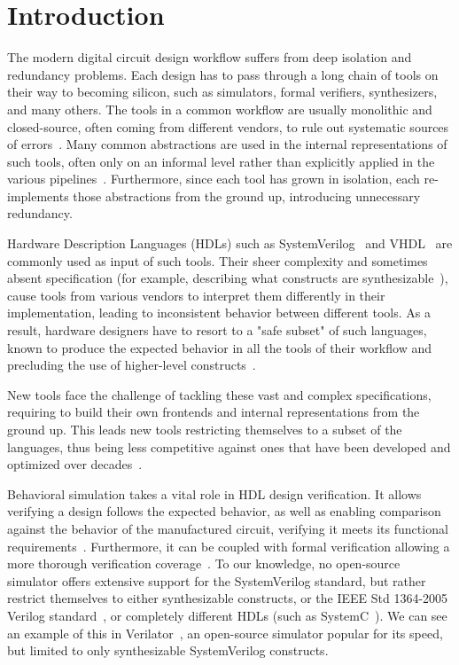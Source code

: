 \chapter{Introduction}
\label{ch:intro}
The modern digital circuit design workflow suffers from deep isolation and redundancy problems. Each design has to pass through a long chain of tools on their way to becoming silicon, such as simulators, formal verifiers, synthesizers, and many others. The tools in a common workflow are usually monolithic and closed-source, often coming from different vendors, to rule out systematic sources of errors~\cite{Schuiki2020}. Many common abstractions are used in the internal representations of such tools, often only on an informal level rather than explicitly applied in the various pipelines~\cite{Neuendorffer}. Furthermore, since each tool has grown in isolation, each re-implements those abstractions from the ground up, introducing unnecessary redundancy.

Hardware Description Languages (HDLs) such as SystemVerilog~\cite{SV2018} and VHDL~\cite{VHDL2009} are commonly used as input of such tools. Their sheer complexity and sometimes absent specification (for example, describing what constructs are synthesizable~\cite{Sutherland2006APF}), cause tools from various vendors to interpret them differently in their implementation, leading to inconsistent behavior between different tools. As a result, hardware designers have to resort to a "safe subset" of such languages, known to produce the expected behavior in all the tools of their workflow and precluding the use of higher-level constructs~\cite{Schuiki2020}.

New tools face the challenge of tackling these vast and complex specifications, requiring to build their own frontends and internal representations from the ground up. This leads new tools restricting themselves to a subset of the languages, thus being less competitive against ones that have been developed and optimized over decades~\cite{Schuiki2020}.

Behavioral simulation takes a vital role in HDL design verification. It allows verifying a design follows the expected behavior, as well as enabling comparison against the behavior of the manufactured circuit, verifying it meets its functional requirements~\cite{Ashenden1994}. Furthermore, it can be coupled with formal verification allowing a more thorough verification coverage~\cite{YuanLu2001}. To our knowledge, no open-source simulator offers extensive support for the SystemVerilog standard, but rather restrict themselves to either synthesizable constructs, or the IEEE Std 1364-2005 Verilog standard~\cite{V2006}, or completely different HDLs (such as SystemC~\cite{systemc}). We can see an example of this in Verilator~\cite{verilator}, an open-source simulator popular for its speed, but limited to only synthesizable SystemVerilog constructs.

